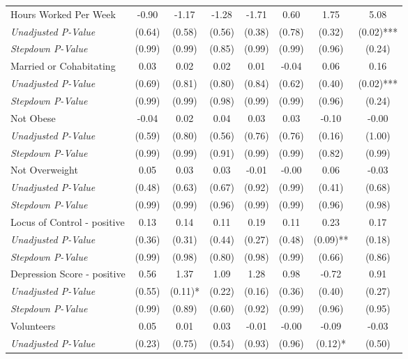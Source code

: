 \begin{tabular}{l c c c c c c c}
Hours Worked Per Week & -0.90 & -1.17 & -1.28 & -1.71 & 0.60 & 1.75 & 5.08 \\
\quad \textit{Unadjusted P-Value} & (0.64) & (0.58) & (0.56) & (0.38) & (0.78) & (0.32) & (0.02)*** \\
\quad \textit{Stepdown P-Value} & (0.99) & (0.99) & (0.85) & (0.99) & (0.99) & (0.96) & (0.24) \\
Married or Cohabitating & 0.03 & 0.02 & 0.02 & 0.01 & -0.04 & 0.06 & 0.16 \\
\quad \textit{Unadjusted P-Value} & (0.69) & (0.81) & (0.80) & (0.84) & (0.62) & (0.40) & (0.02)*** \\
\quad \textit{Stepdown P-Value} & (0.99) & (0.99) & (0.98) & (0.99) & (0.99) & (0.96) & (0.24) \\
Not Obese & -0.04 & 0.02 & 0.04 & 0.03 & 0.03 & -0.10 & -0.00 \\
\quad \textit{Unadjusted P-Value} & (0.59) & (0.80) & (0.56) & (0.76) & (0.76) & (0.16) & (1.00) \\
\quad \textit{Stepdown P-Value} & (0.99) & (0.99) & (0.91) & (0.99) & (0.99) & (0.82) & (0.99) \\
Not Overweight & 0.05 & 0.03 & 0.03 & -0.01 & -0.00 & 0.06 & -0.03 \\
\quad \textit{Unadjusted P-Value} & (0.48) & (0.63) & (0.67) & (0.92) & (0.99) & (0.41) & (0.68) \\
\quad \textit{Stepdown P-Value} & (0.99) & (0.99) & (0.96) & (0.99) & (0.99) & (0.96) & (0.98) \\
Locus of Control - positive & 0.13 & 0.14 & 0.11 & 0.19 & 0.11 & 0.23 & 0.17 \\
\quad \textit{Unadjusted P-Value} & (0.36) & (0.31) & (0.44) & (0.27) & (0.48) & (0.09)** & (0.18) \\
\quad \textit{Stepdown P-Value} & (0.99) & (0.98) & (0.80) & (0.98) & (0.99) & (0.66) & (0.86) \\
Depression Score - positive & 0.56 & 1.37 & 1.09 & 1.28 & 0.98 & -0.72 & 0.91 \\
\quad \textit{Unadjusted P-Value} & (0.55) & (0.11)* & (0.22) & (0.16) & (0.36) & (0.40) & (0.27) \\
\quad \textit{Stepdown P-Value} & (0.99) & (0.89) & (0.60) & (0.92) & (0.99) & (0.96) & (0.95) \\
Volunteers & 0.05 & 0.01 & 0.03 & -0.01 & -0.00 & -0.09 & -0.03 \\
\quad \textit{Unadjusted P-Value} & (0.23) & (0.75) & (0.54) & (0.93) & (0.96) & (0.12)* & (0.50) \\

\end{tabular}
